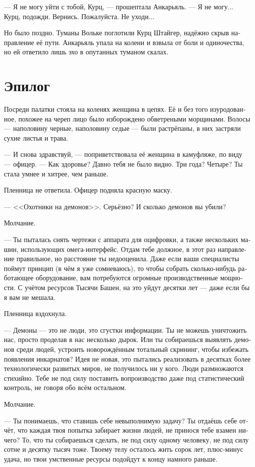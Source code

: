 \documentclass[a4paper,10pt,fleqn]{book}\usepackage{polyglossia}\setdefaultlanguage[babelshorthands=true]{russian}\setotherlanguage{english}\defaultfontfeatures{Ligatures=TeX,Mapping=tex-text}\usepackage{xcolor}\newcommand{\ml}[3]{#2}
\begin{document}
--- Я не могу уйти с тобой, Курц, --- прошептала Анкарьяль.
--- Я не могу...
Курц, подожди.
Вернись.
Пожалуйста.
Не уходи...

Но было поздно.
Туманы Вольке поглотили Курц Штайгер, надёжно скрыв направление её пути.
Анкарьяль упала на колени и взвыла от боли и одиночества, но ей ответило лишь эхо в опутанных туманом скалах.

\section{Эпилог}

Посреди палатки стояла на коленях женщина в цепях.
Её и без того изуродованное, похожее на череп лицо было изборождено обветреными морщинами.
Волосы --- наполовину черные, наполовину седые --- были растрёпаны, в них застряли сухие листья и трава.

--- И снова здравствуй, --- поприветствовала её женщина в камуфляже, по виду --- офицер.
--- Как здоровье?
Давно тебя не было видно.
Три года?
Четыре?
Ты стала умнее и хитрее, чем раньше.

Пленница не ответила.
Офицер подняла красную маску.

--- <<Охотники на демонов>>.
Серьёзно?
И сколько демонов вы убили?

Молчание.

--- Ты пыталась снять чертежи с аппарата для оцифровки, а также нескольких машин, использующих омега-интерфейс.
Отдам тебе должное, в этот раз направление правильное, но расстояние ты недооценила.
Даже если ваши специалисты поймут принцип (в чём я уже сомневаюсь), то чтобы собрать сколько-нибудь работающее оборудование, вам потребуются огромные производственные мощности.
С учётом ресурсов Тысячи Башен, на это уйдут десятки лет --- даже если бы я вам не мешала.

Пленница вздохнула.

--- Демоны --- это не люди, это сгустки информации.
Ты не можешь уничтожить нас, просто проделав в нас несколько дырок.
Или ты собираешься выявлять демонов среди людей, устроить новорождённым тотальный скрининг, чтобы избежать появления инкарнатов?
Идея не новая, это пытались реализовать в десятках более технологически развитых миров, не получилось ни у кого.
Люди размножаются стихийно.
Тебе не под силу поставить вопроизводство даже под статистический контроль, не говоря обо всём остальном.

Молчание.

--- Ты понимаешь, что ставишь себе невыполнимую задачу?
Ты отдаёшь себе отчёт, что каждая твоя попытка забирает жизни людей, не принося тебе взамен ничего?
То, что ты собираешься сделать, не под силу одному человеку, не под силу сотне и десятку тысяч тоже.
Твоему телу осталось жить сорок лет, плюс-минус удача, но твои умственные ресурсы подойдут к концу намного раньше.
\end{document}

